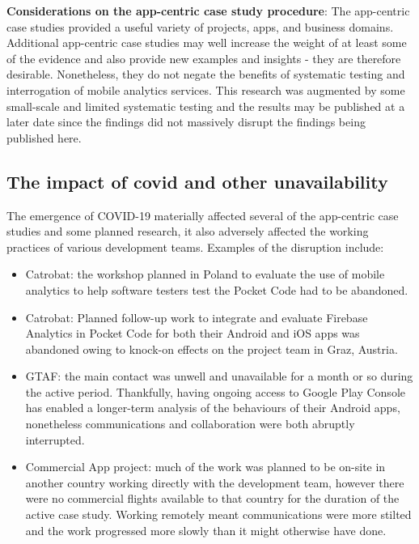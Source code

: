\textbf{Considerations on the app-centric case study procedure}: 
The app-centric case studies provided a useful variety of projects, apps, and business domains. Additional app-centric case studies may well increase the weight of at least some of the evidence and also provide new examples and insights - they are therefore desirable. Nonetheless, they do not negate the benefits of systematic testing and interrogation of mobile analytics services. This research was augmented by some small-scale and limited systematic testing and the results may be published at a later date since the findings did not massively disrupt the findings being published here.

\afterpage{\clearpage}

\subsection{The impact of covid and other unavailability}
The emergence of COVID-19 materially affected several of the app-centric case studies and some planned research, it also adversely affected the working practices of various development teams.
Examples of the disruption include:

\begin{itemize}
    \item Catrobat: the workshop planned in Poland to evaluate the use of mobile analytics to help software testers test the Pocket Code had to be abandoned.
    \item Catrobat: Planned follow-up work to integrate and evaluate Firebase Analytics in Pocket Code for both their Android and iOS apps was abandoned owing to knock-on effects on the project team in Graz, Austria. 
    \item GTAF: the main contact was unwell and unavailable for a month or so during the active period. Thankfully, having ongoing access to Google Play Console has enabled a longer-term analysis of the behaviours of their Android apps, nonetheless communications and collaboration were both abruptly interrupted.
    \item Commercial App project: much of the work was planned to be on-site in another country working directly with the development team, however there were no commercial flights available to that country for the duration of the active case study. Working remotely meant communications were more stilted and the work progressed more slowly than it might otherwise have done. 
\end{itemize}

